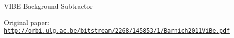 V\+I\+BE Background Subtractor

Original paper\+: \href{http://orbi.ulg.ac.be/bitstream/2268/145853/1/Barnich2011ViBe.pdf}{\tt http\+://orbi.\+ulg.\+ac.\+be/bitstream/2268/145853/1/\+Barnich2011\+Vi\+Be.\+pdf} 